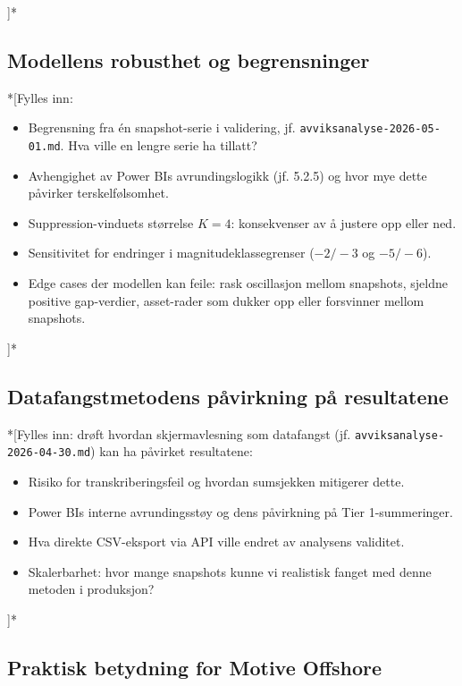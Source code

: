 \documentclass[a4paper,11pt]{article}
\begin{document}
]*

\subsection{Modellens robusthet og begrensninger}

*[Fylles inn:

\begin{itemize}
\item Begrensning fra én snapshot-serie i validering, jf. \texttt{avviksanalyse-2026-05-01.md}. Hva ville en lengre serie ha tillatt?
\item Avhengighet av Power BIs avrundingslogikk (jf. 5.2.5) og hvor mye dette påvirker terskelfølsomhet.
\item Suppression-vinduets størrelse $K = 4$: konsekvenser av å justere opp eller ned.
\item Sensitivitet for endringer i magnitudeklassegrenser ($-2/-3$ og $-5/-6$).
\item Edge cases der modellen kan feile: rask oscillasjon mellom snapshots, sjeldne positive gap-verdier, asset-rader som dukker opp eller forsvinner mellom snapshots.
\end{itemize}

]*

\subsection{Datafangstmetodens påvirkning på resultatene}

*[Fylles inn: drøft hvordan skjermavlesning som datafangst (jf. \texttt{avviksanalyse-2026-04-30.md}) kan ha påvirket resultatene:

\begin{itemize}
\item Risiko for transkriberingsfeil og hvordan sumsjekken mitigerer dette.
\item Power BIs interne avrundingsstøy og dens påvirkning på Tier 1-summeringer.
\item Hva direkte CSV-eksport via API ville endret av analysens validitet.
\item Skalerbarhet: hvor mange snapshots kunne vi realistisk fanget med denne metoden i produksjon?
\end{itemize}

]*

\subsection{Praktisk betydning for Motive Offshore}
\end{document}
